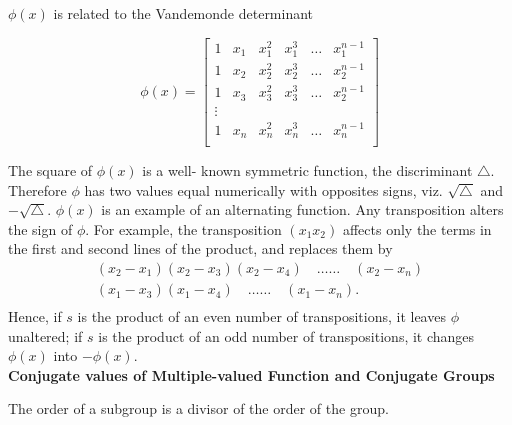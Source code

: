 $\phi(x)$ is related to the Vandemonde determinant

$$\phi(x) =
\begin{bmatrix}
1 & x_1 & x_1^2 & x_1^3 & \hdots & x_1^{n-1} \\
1 & x_2 & x_2^2 & x_2^3 &\hdots &x_2^{n-1} \\
1 & x_3 & x_3^2 & x_3^3 &\hdots & x_2^{n-1} \\
\vdots \\
1 & x_n & x_n^2 & x_n^3 &\hdots & x_n^{n-1} \\
\end{bmatrix}
$$

The square of $\phi(x)$ is a
well- known symmetric function, the discriminant $\triangle$. Therefore $\phi$ has two values equal
numerically with opposites signs, viz. $\sqrt{\triangle}$ and $-\sqrt{\triangle}$. $\phi(x)$ is an example
of an alternating function. Any transposition alters the sign of $\phi$. For example, the transposition
$(x_1x_2)$ affects only the terms in the first and second lines of the product, and replaces them by
\[
\begin{array}{r}
(x_2-x_1) (x_2 - x_3) (x_2 - x_4) \quad \hdots\hdots\quad (x_2 - x_n) \\
(x_1-x_3) (x_1-x_4) \quad \hdots\hdots\quad (x_1 - x_n). \\
\end{array}
\]
Hence, if $s$ is the product of an even number of transpositions, it leaves $\phi$ unaltered; if $s$
is the product of an odd number of transpositions, it changes $\phi(x)$ into $-\phi(x)$. \\
{\bf Conjugate values of Multiple-valued Function and Conjugate Groups}\\

\begin{theorem}[Lagrange] The order of a subgroup is a divisor of the order of the group.
\end{theorem}

